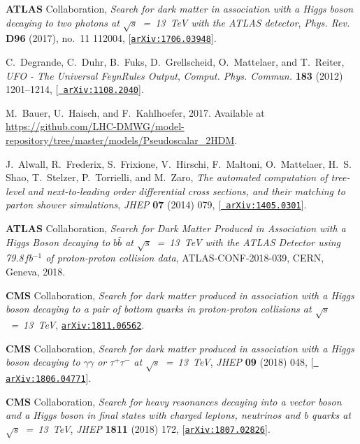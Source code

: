 \documentclass[review]{elsarticle}
\begin{document}
\begin{thebibliography}{100}
{\bf ATLAS} Collaboration, {\it {Search for dark matter in
  association with a Higgs boson decaying to two photons at $\sqrt{s}$~=~13~TeV
  with the ATLAS detector}},  {\em Phys. Rev.} {\bf D96} (2017), no.~11 112004,
  [\href{http://arxiv.org/abs/1706.03948}{{\tt arXiv:1706.03948}}].

C.~Degrande, C.~Duhr, B.~Fuks, D.~Grellscheid, O.~Mattelaer, and T.~Reiter,
  {\it {UFO - The Universal FeynRules Output}},  {\em Comput. Phys. Commun.}
  {\bf 183} (2012) 1201--1214, [\href{http://arxiv.org/abs/1108.2040}{{\tt
  arXiv:1108.2040}}].

M.~Bauer, U.~Haisch, and F.~Kahlhoefer, 2017.
\newblock Available at
  \url{https://github.com/LHC-DMWG/model-repository/tree/master/models/Pseudoscalar_2HDM}.

J.~Alwall, R.~Frederix, S.~Frixione, V.~Hirschi, F.~Maltoni, O.~Mattelaer,
  H.~S. Shao, T.~Stelzer, P.~Torrielli, and M.~Zaro, {\it {The automated
  computation of tree-level and next-to-leading order differential cross
  sections, and their matching to parton shower simulations}},  {\em JHEP} {\bf
  07} (2014) 079, [\href{http://arxiv.org/abs/1405.0301}{{\tt
  arXiv:1405.0301}}].

{\bf ATLAS} Collaboration, {\it {Search for Dark Matter Produced in Association
  with a Higgs Boson decaying to $b\bar{b}$ at $\sqrt{s}$~=~13~TeV with the
  ATLAS Detector using 79.8$\,$fb$^{-1}$ of proton-proton collision data}},
 ATLAS-CONF-2018-039, CERN, Geneva, 2018.
 
{\bf CMS} Collaboration, {\it {Search for dark matter
  produced in association with a Higgs boson decaying to a pair of bottom
  quarks in proton-proton collisions at $\sqrt{s}$~=~13~TeV}},  
  \href{http://arxiv.org/abs/1811.06562}{{\tt arXiv:1811.06562}}.

{\bf CMS} Collaboration, {\it {Search for dark matter produced in association with a
                        Higgs boson decaying to $\gamma\gamma$ or $\tau^+\tau^-$
                        at $\sqrt{s}$~=~13~TeV}},  {\em JHEP} {\bf 09} (2018) 048, [\href{http://arxiv.org/abs/1806.04771}{{\tt
  arXiv:1806.04771}}].
  
{\bf CMS} Collaboration, {\it {Search for heavy resonances decaying into a vector boson
                        and a Higgs boson in final states with charged leptons,
                        neutrinos and b quarks at $\sqrt{s}$~=~13~TeV}}, 
                         {\em JHEP} {\bf 1811}  (2018) 172, 
                        [\href{http://arxiv.org/abs/1807.02826}{{\tt arXiv:1807.02826}}].  


\end{thebibliography}
\end{document}
